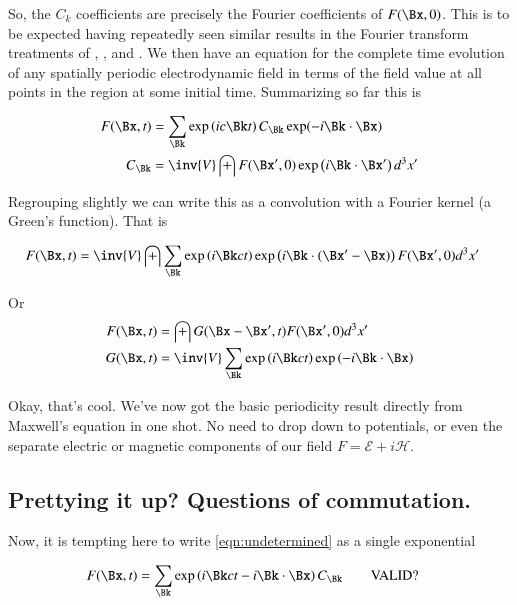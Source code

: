 \documentclass{article}
\newcommand{\EE}[0]{\boldsymbol{\mathcal{E}}}
\newcommand{\HH}[0]{\boldsymbol{\mathcal{H}}}
\begin{document}
So, the $C_k$ coefficients are precisely the Fourier coefficients of $F(\Bx,0)$.  This is to be expected having repeatedly seen similar results in the Fourier transform treatments of 
\cite{PJfourierMaxwellSecondOrder}, \cite{PJfirstOrderMaxwell}, and \cite{PJ4dFourier}.
We then have an equation for the complete time evolution of any spatially periodic electrodynamic field in terms of the field value at all points in the region at some initial time.  Summarizing so far this is

\begin{align}
F(\Bx,t) &= \sum_{\Bk} \exp\left(i c \Bk t \right) 
C_{\Bk}
\exp(-i \Bk \cdot \Bx) \\
C_{\Bk}
&= \inv{V} \int F(\Bx', 0) \exp\left( i\Bk \cdot \Bx' \right) d^3 x'
\end{align}

Regrouping slightly we can write this as a convolution with a Fourier kernel (a Green's function).  That is

\begin{align}\label{eqn:bivectorSolNonGreens}
F(\Bx,t) &= \inv{V} \int \sum_{\Bk} \exp\left( i \Bk ct \right) \exp\left( i \Bk \cdot (\Bx' - \Bx) \right) F(\Bx', 0) d^3 x'
\end{align}

Or
\begin{align}\label{eqn:bivectorSolution}
F(\Bx,t) &= \int G(\Bx - \Bx', t) F(\Bx', 0) d^3 x' \\
G(\Bx,t) &= \inv{V} \sum_{\Bk} \exp\left( i \Bk ct \right) \exp\left( -i \Bk \cdot \Bx \right)
\end{align}

Okay, that's cool.  We've now got the basic periodicity result directly from Maxwell's equation in one shot.  No need to drop down to
potentials, or even the separate electric or magnetic components of our field $F = \EE + i \HH$.

\subsection{ Prettying it up?  Questions of commutation. }

Now, it is tempting here to write 
\ref{eqn:undetermined}
as a single exponential

\begin{align}\label{eqn:isItValid}
F(\Bx,t) 
&= \sum_{\Bk} \exp\left(i \Bk c t - i\Bk \cdot \Bx \right) C_{\Bk} \quad\quad \mbox{VALID?}
\end{align}
\end{document}
